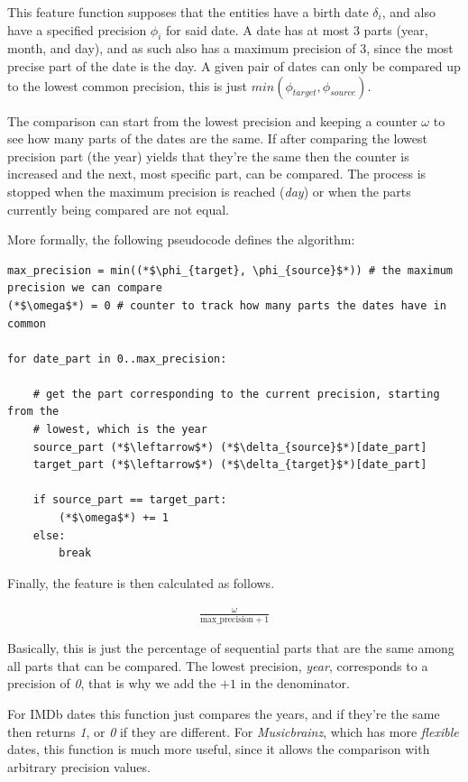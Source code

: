 \documentclass[epsfig,a4paper,11pt,titlepage,twoside,openany]{book}
\begin{document}
This feature function supposes that the entities have a birth date $\delta_i$, and also have a specified precision $\phi_i$ for said date. A date has at most 3 parts (year, month, and day), and as such also has a maximum precision of 3, since the most precise part of the date is the day. A given pair of dates can only be compared up to the lowest common precision, this is just $min(\phi_{target}, \phi_{source})$. 

The comparison can start from the lowest precision and keeping a counter $\omega$ to see how many parts of the dates are the same. If after comparing the lowest precision part (the year) yields that they're the same then the counter is increased and the next, most specific part, can be compared. The process is stopped when the maximum precision is reached (\textit{day}) or when the parts currently being compared are not equal.

More formally, the following pseudocode defines the algorithm:

\begin{lstlisting}
max_precision = min((*$\phi_{target}, \phi_{source}$*)) # the maximum precision we can compare
(*$\omega$*) = 0 # counter to track how many parts the dates have in common

for date_part in 0..max_precision:

    # get the part corresponding to the current precision, starting from the 
    # lowest, which is the year
    source_part (*$\leftarrow$*) (*$\delta_{source}$*)[date_part]
    target_part (*$\leftarrow$*) (*$\delta_{target}$*)[date_part]
    
    if source_part == target_part:
        (*$\omega$*) += 1
    else:
        break
\end{lstlisting}

Finally, the feature is then calculated as follows.

\begin{align*} 
\frac{\omega}{\text{max\_precision} + 1}
\end{align*}

Basically, this is just the percentage of sequential parts that are the same among all parts that can be compared. The lowest precision, \textit{year}, corresponds to a precision of \textit{0}, that is why we add the $+1$ in the denominator.

For IMDb dates this function just compares the years, and if they're the same then returns \textit{1}, or \textit{0} if they are different. For \textit{Musicbrainz}, which has more \textit{flexible} dates, this function is much more useful, since it allows the comparison with arbitrary precision values.
 
\end{document}
